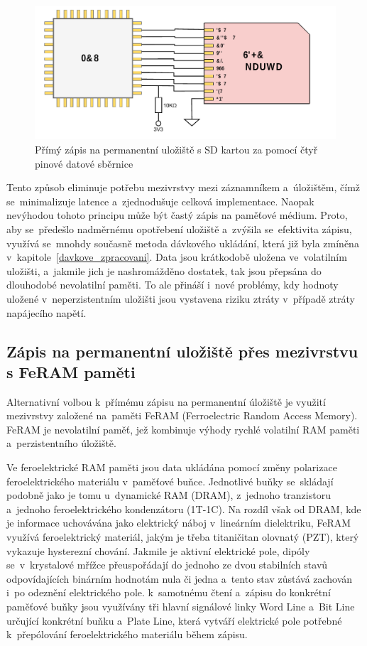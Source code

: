 \begin{figure}[h]
    \centering
    \includegraphics[width=1.00\textwidth]{obrazky-figures/forward_write.pdf}
    
    \caption{Přímý zápis na permanentní uložiště s SD kartou za pomocí čtyř pinové datové sběrnice}
    \label{fig:forward-write}
\end{figure}

Tento způsob eliminuje potřebu mezivrstvy mezi záznamníkem a~úložištěm, čímž se~minimalizuje latence a~zjednodušuje celková implementace. Naopak nevýhodou tohoto principu může být častý zápis na paměťové médium. Proto, aby se~předešlo nadměrnému opotřebení uložiště a~zvýšila se~efektivita zápisu, využívá se~mnohdy současně metoda dávkového ukládání, která již byla zmíněna v~kapitole~\ref{davkove_zpracovani}. Data jsou krátkodobě uložena ve~volatilním uložišti, a~jakmile jich je nashromážděno dostatek, tak jsou přepsána do dlouhodobé nevolatilní paměti. To ale přináší i~nové problémy, kdy hodnoty uložené v~neperzistentním uložišti jsou vystavena riziku ztráty v~případě ztráty napájecího napětí.~\cite{ieee_digital_sound_recorder_arm_sd_card}

\subsection{Zápis na permanentní uložiště přes mezivrstvu s FeRAM paměti}
Alternativní volbou k~přímému zápisu na permanentní úložiště je využití mezivrstvy založené na~paměti FeRAM (Ferroelectric Random Access Memory). FeRAM je nevolatilní paměť, jež kombinuje výhody rychlé volatilní RAM paměti a~perzistentního úložiště.

Ve feroelektrické RAM paměti jsou data ukládána pomocí změny polarizace feroelektrického materiálu v~paměťové buňce. Jednotlivé buňky se~skládají podobně jako je tomu u~dynamické RAM (DRAM), z~jednoho tranzistoru a~jednoho feroelektrického kondenzátoru (1T-1C). Na rozdíl však od DRAM, kde je informace uchovávána jako elektrický náboj v~lineárním dielektriku, FeRAM využívá feroelektrický materiál, jakým je třeba titaničitan olovnatý (PZT), který vykazuje hysterezní chování. Jakmile je aktivní elektrické pole, dipóly se~v~krystalové mřížce přeuspořádají do jednoho ze dvou stabilních stavů odpovídajících binárním hodnotám nula či jedna a~tento stav zůstává zachován i~po odeznění elektrického pole. k~samotnému čtení a~zápisu do konkrétní paměťové buňky jsou využívány tři hlavní signálové linky Word Line a~Bit Line určující konkrétní buňku a~Plate Line, která vytváří elektrické pole potřebné k~přepólování feroelektrického materiálu během zápisu.~\cite{ieee_feram_ultra_high_density_embedded_mem}


